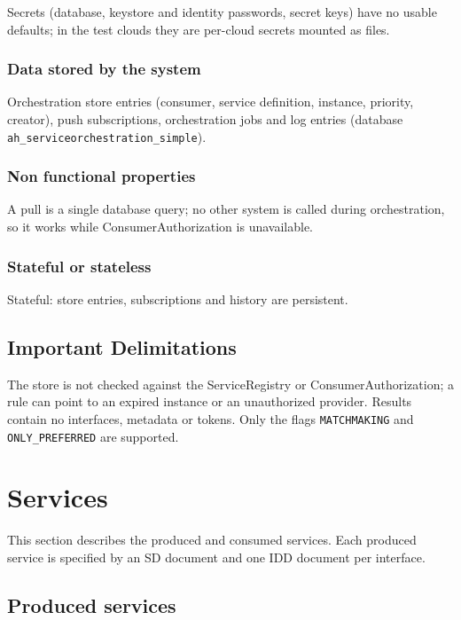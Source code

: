 \documentclass[a4paper]{arrowhead}
\begin{document}
Secrets (database, keystore and identity passwords, secret keys) have no usable defaults; in the test clouds they are per-cloud secrets mounted as files.

\subsubsection{Data stored by the system}

Orchestration store entries (consumer, service definition, instance, priority, creator), push subscriptions, orchestration jobs and log entries (database \texttt{ah\_\allowbreak{}serviceorchestration\_\allowbreak{}simple}).

\subsubsection{Non functional properties}

A pull is a single database query; no other system is called during orchestration, so it works while Consumer\allowbreak{}Authorization is unavailable.

\subsubsection{Stateful or stateless}

Stateful: store entries, subscriptions and history are persistent.

\subsection{Important Delimitations}
\label{sec:delimitations}

The store is not checked against the ServiceRegistry or Consumer\allowbreak{}Authorization; a rule can point to an expired instance or an unauthorized provider. Results contain no interfaces, metadata or tokens. Only the flags \texttt{MATCHMAKING} and \texttt{ONLY\_\allowbreak{}PREFERRED} are supported.

\newpage

\section{Services}
\label{sec:services}

This section describes the produced and consumed services. Each produced service is specified by an SD document and one IDD document per interface.

\subsection{Produced services}
\end{document}
